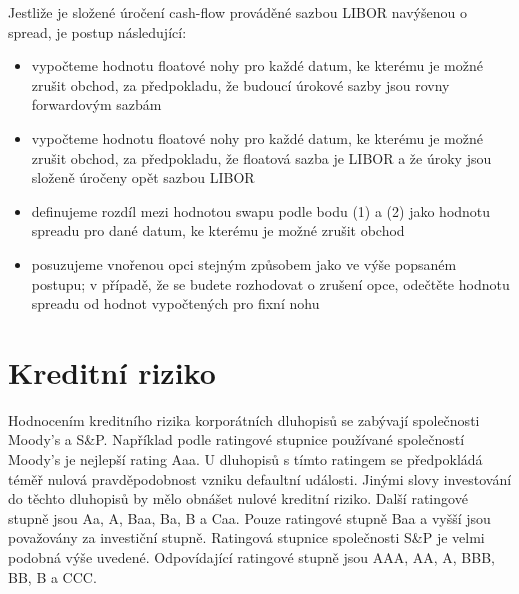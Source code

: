 \documentclass[a4paper]{book}
\begin{document}
Jestliže je složené úročení cash-flow prováděné sazbou LIBOR navýšenou o spread, je postup následující:
\begin{itemize}
\item vypočteme hodnotu floatové nohy pro každé datum, ke kterému je možné zrušit obchod, za předpokladu, že budoucí úrokové sazby jsou rovny forwardovým sazbám
\item vypočteme hodnotu floatové nohy pro každé datum, ke kterému je možné zrušit obchod, za předpokladu, že floatová sazba je LIBOR a že úroky jsou složeně úročeny opět sazbou LIBOR
\item definujeme rozdíl mezi hodnotou swapu podle bodu (1) a (2) jako hodnotu spreadu pro dané datum, ke kterému je možné zrušit obchod
\item posuzujeme vnořenou opci stejným způsobem jako ve výše popsaném postupu; v případě, že se budete rozhodovat o zrušení opce, odečtěte hodnotu spreadu od hodnot vypočtených pro fixní nohu
\end{itemize}

\chapter{Kreditní riziko}

Hodnocením kreditního rizika korporátních dluhopisů se zabývají společnosti Moody's a S\&P. Například podle ratingové stupnice používané společností Moody's je nejlepší rating Aaa. U dluhopisů s tímto ratingem se předpokládá téměř nulová pravděpodobnost vzniku defaultní události. Jinými slovy investování do těchto dluhopisů by mělo obnášet nulové kreditní riziko. Další ratingové stupně jsou Aa, A, Baa, Ba, B a Caa. Pouze ratingové stupně Baa a vyšší jsou považovány za investiční stupně. Ratingová stupnice společnosti S\&P je velmi podobná výše uvedené. Odpovídající ratingové stupně jsou AAA, AA, A, BBB, BB, B a CCC.
\end{document}
